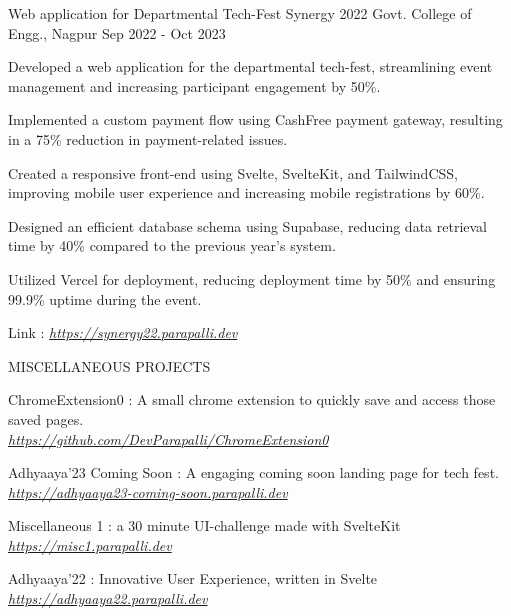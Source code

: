 \documentclass[11pt, a4paper]{awesome-cv}
\begin{document}
\begin{cventries}
  \vskip 0.35cm

\cventry
{Web application for Departmental Tech-Fest}
{Synergy 2022}
{Govt. College of Engg., Nagpur}
{Sep 2022 - Oct 2023}
{
  \begin{cvitems}
    \item {Developed a web application for the departmental tech-fest, streamlining event management and increasing participant engagement by 50\%.}
      \item {Implemented a custom payment flow using CashFree payment gateway, resulting in a 75\% reduction in payment-related issues.}
      \item {Created a responsive front-end using Svelte, SvelteKit, and TailwindCSS, improving mobile user experience and increasing mobile registrations by 60\%.}
      \item {Designed an efficient database schema using Supabase, reducing data retrieval time by 40\% compared to the previous year's system.}
      \item {Utilized Vercel for deployment, reducing deployment time by 50\% and ensuring 99.9\% uptime during the event.}
    \item {Link : \href{https://synergy22.parapalli.dev}{\textit{https://synergy22.parapalli.dev}}}
  \end{cvitems}
}


\cventry
{}
{\uppercase{Miscellaneous Projects}}
{}
{}
{
  \vspace{-0.45cm}
  \begin{cvitems}
    \item {ChromeExtension0 : A small chrome extension to quickly save and access those saved pages.\\ \href{https://github.com/DevParapalli/ChromeExtension0}{\textit{https://github.com/DevParapalli/ChromeExtension0}} }
    \item {Adhyaaya'23 Coming Soon : A engaging coming soon landing page for tech fest.\\ \href{https://adhyaaya23-coming-soon.parapalli.dev}{\textit{https://adhyaaya23-coming-soon.parapalli.dev}} }
    \item {Miscellaneous 1 : a 30 minute UI-challenge made with SvelteKit \\ \href{https://misc1.parapalli.dev}{\textit{https://misc1.parapalli.dev}} }
    \item {Adhyaaya'22 : Innovative User Experience, written in Svelte \\ \href{https://adhyaaya22.parapalli.dev}{\textit{https://adhyaaya22.parapalli.dev}} }
  \end{cvitems}
}



\end{cventries}
\end{document}
